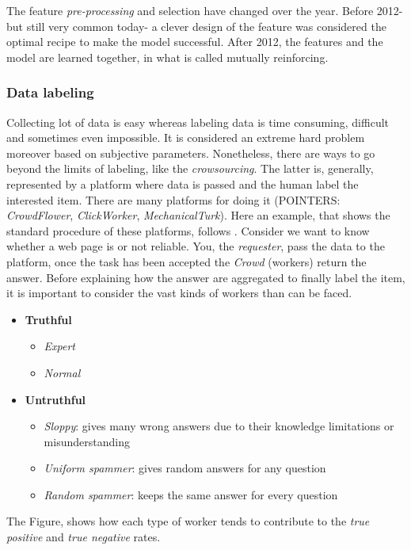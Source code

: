 The feature \emph{pre-processing} and selection have changed over the year. Before 2012- but still very common today- a clever design of the feature was considered the optimal recipe to make the model successful. After 2012, %
the features and the model are learned together, in what is called mutually reinforcing.

\subsubsection*{Data labeling}

Collecting lot of data is easy whereas labeling data is time consuming, difficult and sometimes even impossible. It is considered an extreme hard problem moreover based on subjective parameters. Nonetheless, there are ways to go beyond the limits of labeling, like the \emph{crowsourcing}. The latter is, generally, represented by a platform where data is passed and the human label the interested item. There are many platforms for doing it (POINTERS: \emph{CrowdFlower}, \emph{ClickWorker}, \emph{MechanicalTurk}).  Here an example, that shows the standard procedure of these platforms, follows . Consider we want to know whether a web page is or not reliable.  You, the \emph{requester}, pass the data to the platform, once the task has been accepted the \emph{Crowd} (workers) return the answer. Before explaining how the answer are aggregated to finally label the item, it is important to consider the vast kinds of workers than can be faced.
\begin{itemize}
\item \textbf{Truthful}
\begin{itemize}
\item \emph{Expert}
\item \emph{Normal}
\end{itemize}
\item \textbf{Untruthful}
\begin{itemize}
\item \emph{Sloppy}: gives many wrong answers due to their knowledge limitations or misunderstanding
\item \emph{Uniform spammer}: gives random answers for any question
\item \emph{Random spammer}: keeps the same answer for every question
\end{itemize}
\end{itemize}

The Figure, shows how each type of worker tends to contribute to the \emph{true positive} and \emph{true negative}  rates.

